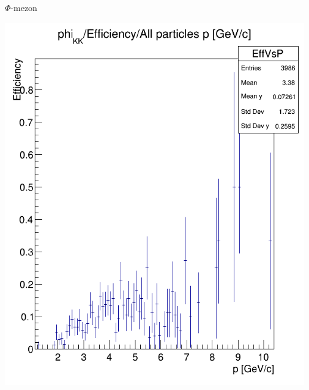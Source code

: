 \documentclass[10pt]{beamer}
\begin{document}
\begin{frame}[t]{$\Phi$-mezon}
\begin{minipage}{\textwidth}
\begin{minipage}{0.45\textwidth}
\includegraphics[width=0.97\textwidth]{../latex/efficieny.png}
\end{minipage}
\end{minipage}
\end{frame}
\end{document}
